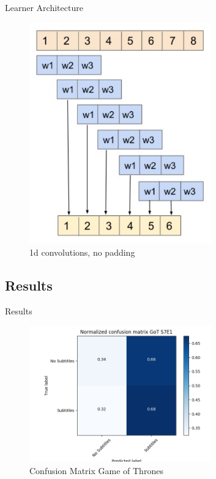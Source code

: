 \documentclass[notes]{beamer}
\begin{document}
\begin{frame}{Learner Architecture}
\begin{minipage}{0.45\textwidth}
\begin{figure}
		\includegraphics[width=0.7\textwidth]{figures/1dconv_nopad}
		\caption{1d convolutions, no padding \cite{catalunya_2017}}
	\end{figure}
\end{minipage}
\end{frame}


\subsection{Results}

\begin{frame}{Results}
\begin{figure}
	\includegraphics[width=0.7\textwidth]{figures/CM_gots7e1.png}
	\caption{Confusion Matrix Game of Thrones}
\end{figure}
\end{frame}
\end{document}
